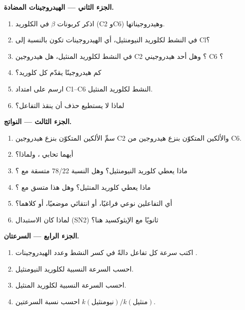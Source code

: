 \begin{problem}
\medskip
\noindent\textbf{الجزء الثاني --- الهيدروجينات المضادة.}
\begin{enumerate}[resume]
  \item اذكر كربونات $\beta$ في الكلوريد (C2 وC6)
        وهيدروجيناتها.
  \item في  النشط لكلوريد النيومنثيل، أي الهيدروجينات تكون
         بالنسبة إلى Cl؟
  \item في  النشط لكلوريد المنثيل، هل هيدروجين C2
        ؟ وهل أحد هيدروجيني C6 ؟
  \item كم هيدروجينًا  يقدّم كل كلوريد؟
  \item ارسم  على امتداد C1--C6  النشط
        لكلوريد المنثيل.
  \item لماذا لا يستطيع حذف  أن ينقذ
        التفاعل؟
\end{enumerate}

\medskip
\noindent\textbf{الجزء الثالث --- النواتج.}
\begin{enumerate}[resume]
  \item سمِّ الألكين المتكوّن بنزع هيدروجين C2 والألكين
        المتكوّن بنزع هيدروجين من C6.
  \item أيهما تحابي ، ولماذا؟
  \item ماذا يعطي كلوريد النيومنثيل؟ وهل النسبة 78/22 متسقة
        مع ؟
  \item ماذا يعطي كلوريد المنثيل؟ وهل هذا متسق مع
        ؟
  \item أي التفاعلين نوعي فراغيًا، أو انتقائي موضعيًا، أو كلاهما؟
  \item لماذا كان الاستبدال (SN2) ثانويًا مع الإيثوكسيد هنا؟
\end{enumerate}

\medskip
\noindent\textbf{الجزء الرابع --- السرعتان.}
\begin{enumerate}[resume]
  \item اكتب سرعة كل تفاعل دالةً في كسر
         النشط وعدد الهيدروجينات .
  \item احسب السرعة النسبية لكلوريد النيومنثيل.
  \item احسب السرعة النسبية لكلوريد المنثيل.
  \item احسب نسبة السرعتين $k(\text{نيومنثيل})/k(\text{منثيل})$.
\end{enumerate}
\end{problem}
